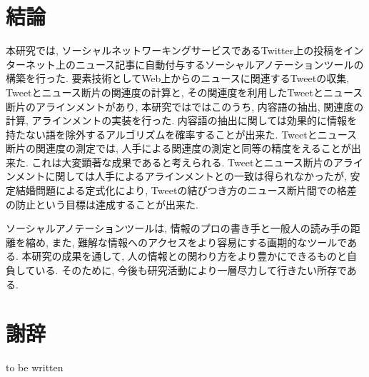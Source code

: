 \documentclass[12pt]{jarticle}
\begin{document}
\section{結論}
本研究では, ソーシャルネットワーキングサービスであるTwitter上の投稿をインターネット上のニュース記事に自動付与するソーシャルアノテーションツールの構築を行った. 要素技術としてWeb上からのニュースに関連するTweetの収集, Tweetとニュース断片の関連度の計算と, その関連度を利用したTweetとニュース断片のアラインメントがあり, 本研究ではではこのうち, 内容語の抽出, 関連度の計算, アラインメントの実装を行った. 内容語の抽出に関しては効果的に情報を持たない語を除外するアルゴリズムを確率することが出来た. Tweetとニュース断片の関連度の測定では, 人手による関連度の測定と同等の精度をえることが出来た. これは大変顕著な成果であると考えられる. Tweetとニュース断片のアラインメントに関しては人手によるアラインメントとの一致は得られなかったが, 安定結婚問題による定式化により, Tweetの結びつき方のニュース断片間での格差の防止という目標は達成することが出来た. 

ソーシャルアノテーションツールは, 情報のプロの書き手と一般人の読み手の距離を縮め, また, 難解な情報へのアクセスをより容易にする画期的なツールである. 本研究の成果を通して, 人の情報との関わり方をより豊かにできるものと自負している. そのために, 今後も研究活動により一層尽力して行きたい所存である. 

\section{謝辞}
to be written
\end{document}
